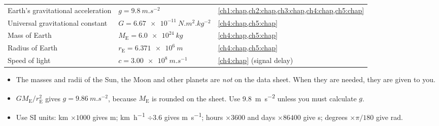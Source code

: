 \begin{table}
  \centering
  \small
  \begin{tabular}{@{}L{58mm}L{50mm}L{32mm}@{}}
    \toprule
     &  & \\
    \midrule
    Earth's gravitational acceleration & $g = \qty{9.8}{m.s^{-2}}$ & \cref{ch1:chap,ch2:chap,ch3:chap,ch4:chap,ch5:chap}\\
    Universal gravitational constant & $G = \qty{6.67e-11}{N.m^2.kg^{-2}}$ & \cref{ch4:chap,ch5:chap}\\
    Mass of Earth & $M_\mathrm{E} = \qty{6.0e24}{kg}$ & \cref{ch4:chap,ch5:chap}\\
    Radius of Earth & $r_\mathrm{E} = \qty{6.371e6}{m}$ & \cref{ch4:chap,ch5:chap}\\
    Speed of light & $c = \qty{3.00e8}{m.s^{-1}}$ & \cref{ch4:chap} (signal delay)\\
    \bottomrule
  \end{tabular}
\end{table}

\begin{itemize}
  \item The masses and radii of the Sun, the Moon and other planets are \emph{not} on the data
        sheet. When they are needed, they are given to you.
  \item $GM_\mathrm{E}/r_\mathrm{E}^2$ gives $g = \qty{9.86}{m.s^{-2}}$, because $M_\mathrm{E}$ is
        rounded on the sheet. Use \qty{9.8}{m.s^{-2}} unless you must calculate $g$.
  \item Use SI units: \si{km} $\times 1000$ gives \si{m}; \si{km.h^{-1}} $\div 3.6$ gives
        \si{m.s^{-1}}; hours $\times 3600$ and days $\times \num{86400}$ give \si{s};
        degrees $\times \pi/180$ give \si{rad}.
\end{itemize}
